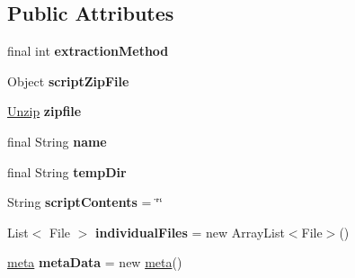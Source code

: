 \subsection*{Public Attributes}
\begin{DoxyCompactItemize}
\item 
\hypertarget{classCASUAL_1_1caspac_1_1Script_ab3b3c928ac0551b948303028e66598d2}{final int {\bfseries extraction\-Method}}\label{classCASUAL_1_1caspac_1_1Script_ab3b3c928ac0551b948303028e66598d2}

\item 
\hypertarget{classCASUAL_1_1caspac_1_1Script_a48efda3482fcf8b2b3b2778495613c5e}{Object {\bfseries script\-Zip\-File}}\label{classCASUAL_1_1caspac_1_1Script_a48efda3482fcf8b2b3b2778495613c5e}

\item 
\hypertarget{classCASUAL_1_1caspac_1_1Script_a1024f90497f23ac4ef6c43426def0239}{\hyperlink{classCASUAL_1_1archiving_1_1Unzip}{Unzip} {\bfseries zipfile}}\label{classCASUAL_1_1caspac_1_1Script_a1024f90497f23ac4ef6c43426def0239}

\item 
\hypertarget{classCASUAL_1_1caspac_1_1Script_afeb97e2aa54ad52e9fe6d471083377d9}{final String {\bfseries name}}\label{classCASUAL_1_1caspac_1_1Script_afeb97e2aa54ad52e9fe6d471083377d9}

\item 
\hypertarget{classCASUAL_1_1caspac_1_1Script_abfe3164c40ad15987db21e7b0a6efb9c}{final String {\bfseries temp\-Dir}}\label{classCASUAL_1_1caspac_1_1Script_abfe3164c40ad15987db21e7b0a6efb9c}

\item 
\hypertarget{classCASUAL_1_1caspac_1_1Script_a2f578888d813eabd4d6dc4872aa3de0f}{String {\bfseries script\-Contents} = \char`\"{}\char`\"{}}\label{classCASUAL_1_1caspac_1_1Script_a2f578888d813eabd4d6dc4872aa3de0f}

\item 
\hypertarget{classCASUAL_1_1caspac_1_1Script_a8b9a3d46df38af3e319e0c2458937528}{List$<$ File $>$ {\bfseries individual\-Files} = new Array\-List$<$File$>$()}\label{classCASUAL_1_1caspac_1_1Script_a8b9a3d46df38af3e319e0c2458937528}

\item 
\hypertarget{classCASUAL_1_1caspac_1_1Script_ad432ae6788ae72a86ba665c91a611ec8}{\hyperlink{classCASUAL_1_1caspac_1_1Script_1_1meta}{meta} {\bfseries meta\-Data} = new \hyperlink{classCASUAL_1_1caspac_1_1Script_1_1meta}{meta}()}\label{classCASUAL_1_1caspac_1_1Script_ad432ae6788ae72a86ba665c91a611ec8}


\end{DoxyCompactItemize}
